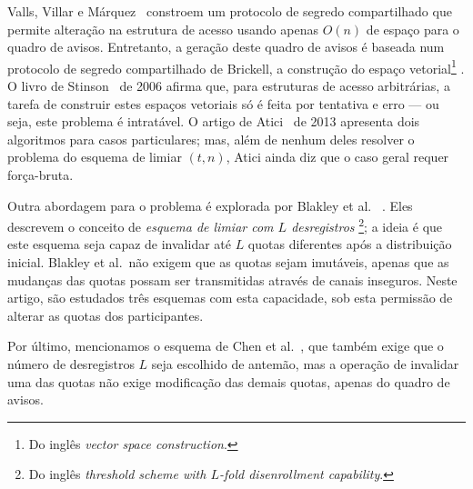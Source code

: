 \documentclass[10pt,twocolumn]{article}
\theoremstyle{definition}
\begin{document}
Valls, Villar e Márquez~\cite{VallsVillarMarquez1999}
constroem um protocolo de segredo compartilhado
que permite alteração na estrutura de acesso
usando apenas $O(n)$ de espaço para o quadro de avisos.
Entretanto,
a geração deste quadro de avisos é baseada
num protocolo de segredo compartilhado de Brickell,
a construção do espaço vetorial\footnote{
    Do inglês \emph{vector space construction}.
}
\cite{Brickell1990}.
O livro de Stinson~\cite[p.~499]{Stinson2006} de 2006
afirma que, para estruturas de acesso arbitrárias,
a tarefa de construir estes espaços vetoriais
só é feita por tentativa e erro
--- ou seja, este problema é intratável.
O artigo de Atici~\cite{Atici2013} de 2013
apresenta dois algoritmos para casos particulares;
mas, além de nenhum deles resolver o problema do esquema de limiar $(t, n)$,
Atici ainda diz que o caso geral requer força-bruta.

Outra abordagem para o problema é explorada por Blakley et al.%
~\cite{BlakleyBlakleyChanMassey1993}.
Eles descrevem o conceito de \emph{esquema de limiar com $L$ desregistros}%
\footnote{
    Do inglês \emph{threshold scheme with $L$-fold disenrollment capability}.
};
a ideia é que este esquema
seja capaz de invalidar até $L$ quotas diferentes após a distribuição inicial.
Blakley et al.\ não exigem que as quotas sejam imutáveis,
apenas que as mudanças das quotas possam ser transmitidas através de canais inseguros.
Neste artigo,
são estudados três esquemas com esta capacidade,
sob esta permissão de alterar as quotas dos participantes.

Por último,
mencionamos o esquema de Chen et al.~\cite{ChenGollmanMitchellWild1997},
que também exige que o número de desregistros $L$ seja escolhido de antemão,
mas a operação de invalidar uma das quotas
não exige modificação das demais quotas,
apenas do quadro de avisos.



\end{document}
